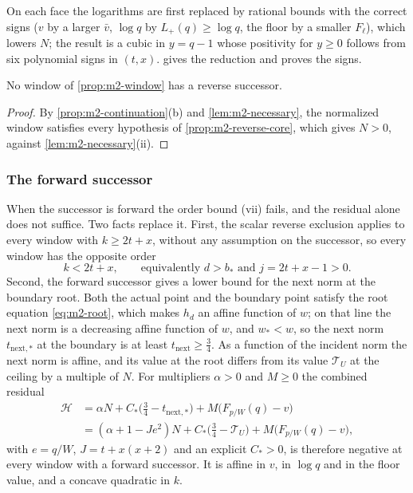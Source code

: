 On each face the logarithms are first replaced by rational bounds with the correct signs ($v$ by a
larger $\bar v$, $\log q$ by $L_+(q)\ge\log q$, the floor by a smaller $F_\ell$), which lowers $N$; the
result is a cubic in $y=q-1$ whose positivity for $y\ge0$ follows from six polynomial signs in
$(t,x)$.  gives the reduction and proves the signs.

\begin{theorem}\label{thm:m2-reverse}
No window of \cref{prop:m2-window} has a reverse successor.
\end{theorem}

\begin{proof}
By \cref{prop:m2-continuation}(b) and \cref{lem:m2-necessary}, the normalized window satisfies every
hypothesis of \cref{prop:m2-reverse-core}, which gives $N>0$, against \cref{lem:m2-necessary}(ii).
\end{proof}

\subsubsection{The forward successor}\label{sec:m2-forward}

When the successor is forward the order bound (vii) fails, and the residual alone does not suffice.
Two facts replace it. First, the scalar reverse exclusion applies to every window with $k\ge2t+x$,
without any assumption on the successor, so every window has the opposite order
\begin{equation}\label{eq:m2-order}
k<2t+x,\qquad\text{equivalently } d>b_*\text{ and } j=2t+x-1>0.
\end{equation}
Second, the forward successor gives a lower bound for the next norm at the
boundary root. Both the actual point and the boundary point satisfy the root equation
\eqref{eq:m2-root}, which makes $h_d$ an affine function of $w$; on that line the next norm is a
decreasing affine function of $w$, and $w_*<w$, so the next norm $t_{\mathrm{next},*}$ at the
boundary is at least $t_{\mathrm{next}}\ge\frac34$. As a function of the
incident norm the next norm is affine, and its value at the root differs from its value
$\mathcal T_U$ at the ceiling by a multiple of $N$. For multipliers $\alpha>0$ and $M\ge0$ the
combined residual
\begin{equation}\label{eq:m2-comb}
\begin{aligned}
\mathcal H&=\alpha N+C_*\bigl(\tfrac34-t_{\mathrm{next},*}\bigr)+M\bigl(F_{p/W}(q)-v\bigr)\\
&=(\alpha+1-Je^2)N+C_*\bigl(\tfrac34-\mathcal T_U\bigr)+M\bigl(F_{p/W}(q)-v\bigr),
\end{aligned}
\end{equation}
with $e=q/W$, $J=t+x(x+2)$ and an explicit $C_*>0$, is therefore negative at every window with a
forward successor. It is affine in $v$, in $\log q$ and in the floor value,
and a concave quadratic in $k$.

